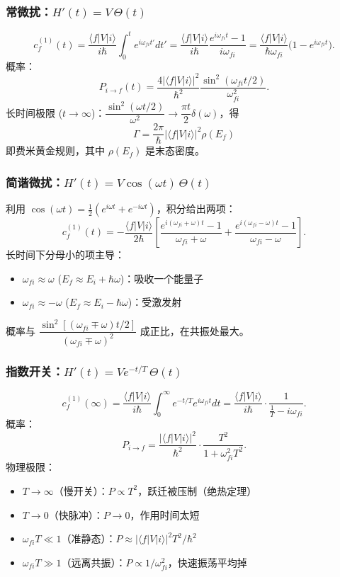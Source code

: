 \begin{derivationbox}[四种典型时间依赖形式]
\subsubsection{常微扰：$H'(t) = V\,\Theta(t)$}

\[
c_f^{(1)}(t) = \frac{\langle f|V|i\rangle}{i\hbar} \int_0^t e^{i\omega_{fi}t'} dt' = \frac{\langle f|V|i\rangle}{i\hbar} \frac{e^{i\omega_{fi}t}-1}{i\omega_{fi}} = \frac{\langle f|V|i\rangle}{\hbar\omega_{fi}} \bigl(1 - e^{i\omega_{fi}t}\bigr).
\]
概率：
\[
P_{i\to f}(t) = \frac{4|\langle f|V|i\rangle|^2}{\hbar^2} \frac{\sin^2(\omega_{fi}t/2)}{\omega_{fi}^2}.
\]
长时间极限 ($t\to\infty$)：$\dfrac{\sin^2(\omega t/2)}{\omega^2} \to \dfrac{\pi t}{2}\delta(\omega)$，得
\[
\Gamma = \frac{2\pi}{\hbar} |\langle f|V|i\rangle|^2 \rho(E_f)
\]
即费米黄金规则，其中 $\rho(E_f)$ 是末态密度。

\subsubsection{简谐微扰：$H'(t) = V\cos(\omega t)\,\Theta(t)$}

利用 $\cos(\omega t) = \frac{1}{2}(e^{i\omega t} + e^{-i\omega t})$，积分给出两项：
\[
c_f^{(1)}(t) = -\frac{\langle f|V|i\rangle}{2\hbar} \left[ \frac{e^{i(\omega_{fi}+\omega)t}-1}{\omega_{fi}+\omega} + \frac{e^{i(\omega_{fi}-\omega)t}-1}{\omega_{fi}-\omega} \right].
\]
长时间下分母小的项主导：
\begin{itemize}
\item $\omega_{fi} \approx \omega$ ($E_f \approx E_i + \hbar\omega$)：吸收一个能量子
\item $\omega_{fi} \approx -\omega$ ($E_f \approx E_i - \hbar\omega$)：受激发射
\end{itemize}
概率与 $\dfrac{\sin^2[(\omega_{fi}\mp\omega)t/2]}{(\omega_{fi}\mp\omega)^2}$ 成正比，在共振处最大。

\subsubsection{指数开关：$H'(t) = V e^{-t/T}\,\Theta(t)$}

\[
c_f^{(1)}(\infty) = \frac{\langle f|V|i\rangle}{i\hbar} \int_0^\infty e^{-t/T} e^{i\omega_{fi}t} dt = \frac{\langle f|V|i\rangle}{i\hbar} \cdot \frac{1}{\frac{1}{T} - i\omega_{fi}}.
\]
概率：
\[
P_{i\to f} = \frac{|\langle f|V|i\rangle|^2}{\hbar^2} \cdot \frac{T^2}{1 + \omega_{fi}^2 T^2}.
\]
物理极限：
\begin{itemize}
\item $T\to\infty$（慢开关）：$P \propto T^2$，跃迁被压制（绝热定理）
\item $T\to 0$（快脉冲）：$P\to 0$，作用时间太短
\item $\omega_{fi}T \ll 1$（准静态）：$P \approx |\langle f|V|i\rangle|^2 T^2/\hbar^2$
\item $\omega_{fi}T \gg 1$（远离共振）：$P \propto 1/\omega_{fi}^2$，快速振荡平均掉
\end{itemize}


\end{derivationbox}
